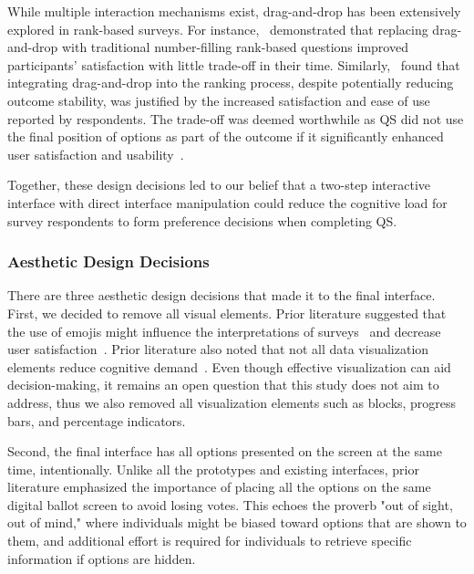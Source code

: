 While multiple interaction mechanisms exist, drag-and-drop has been extensively explored in rank-based surveys. For instance,~\textcite{krosnick2018measurement} demonstrated that replacing drag-and-drop with traditional number-filling rank-based questions improved participants' satisfaction with little trade-off in their time. Similarly,~\textcite{timbrook2013comparison} found that integrating drag-and-drop into the ranking process, despite potentially reducing outcome stability, was justified by the increased satisfaction and ease of use reported by respondents. The trade-off was deemed worthwhile as QS did not use the final position of options as part of the outcome if it significantly enhanced user satisfaction and usability~\cite{rintoulVisualAnimatedResponse}.

Together, these design decisions led to our belief that a two-step interactive interface with direct interface manipulation could reduce the cognitive load for survey respondents to form preference decisions when completing QS.

\subsubsection{Aesthetic Design Decisions}
There are three aesthetic design decisions that made it to the final interface. First, we decided to remove all visual elements. Prior literature suggested that the use of emojis might influence the interpretations of surveys~\cite{herringGenderAgeInfluences2020} and decrease user satisfaction~\cite{toepoelSmileysStarsHearts2019}. Prior literature also noted that not all data visualization elements reduce cognitive demand~\cite{huangMeasuringEffectivenessGraph2009a}. Even though effective visualization can aid decision-making, it remains an open question that this study does not aim to address, thus we also removed all visualization elements such as blocks, progress bars, and percentage indicators.

Second, the final interface has all options presented on the screen at the same time, intentionally. Unlike all the prototypes and existing interfaces, prior literature emphasized the importance of placing all the options on the same digital ballot screen to avoid losing votes. This echoes the proverb "out of sight, out of mind," where individuals might be biased toward options that are shown to them, and additional effort is required for individuals to retrieve specific information if options are hidden.

